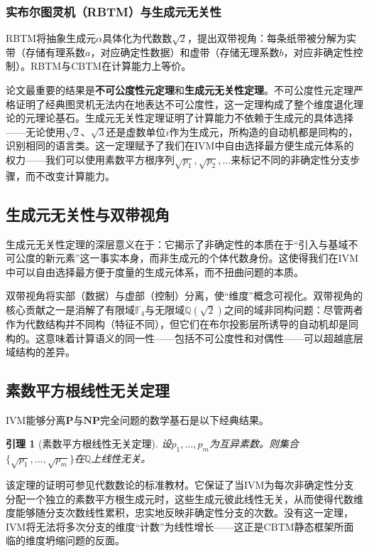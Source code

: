 \documentclass{ctexart}
\newtheorem{lemma}[theorem]{引理}
\begin{document}
	\subsubsection*{实布尔图灵机（RBTM）与生成元无关性}
	
	RBTM将抽象生成元$\alpha$具体化为代数数$\sqrt{2}$，提出双带视角：每条纸带被分解为实带（存储有理系数$a$，对应确定性数据）和虚带（存储无理系数$b$，对应非确定性控制）。RBTM与CBTM在计算能力上等价。
	
	论文\cite{models2026}最重要的结果是\textbf{不可公度性元定理}和\textbf{生成元无关性定理}。不可公度性元定理严格证明了经典图灵机无法内在地表达不可公度性，这一定理构成了整个维度退化理论的元理论基石。生成元无关性定理证明了计算能力不依赖于生成元的具体选择——无论使用$\sqrt{2}$、$\sqrt{3}$还是虚数单位$i$作为生成元，所构造的自动机都是同构的，识别相同的语言类。这一定理赋予了我们在IVM中自由选择最方便生成元体系的权力——我们可以使用素数平方根序列$\sqrt{p_1}, \sqrt{p_2}, \dots$来标记不同的非确定性分支步骤，而不改变计算能力。
	
	\subsection{生成元无关性与双带视角}
	
	生成元无关性定理的深层意义在于：它揭示了非确定性的本质在于``引入与基域不可公度的新元素''这一事实本身，而非生成元的个体代数身份。这使得我们在IVM中可以自由选择最方便于度量的生成元体系，而不扭曲问题的本质。
	
	双带视角将实部（数据）与虚部（控制）分离，使``维度''概念可视化。双带视角的核心贡献之一是消解了有限域$\mathbb{F}_4$与无限域$\mathbb{Q}(\sqrt{2})$之间的域非同构问题：尽管两者作为代数结构并不同构（特征不同），但它们在布尔投影层所诱导的自动机却是同构的。这意味着计算语义的同一性——包括不可公度性和对偶性——可以超越底层域结构的差异。
	
	\subsection{素数平方根线性无关定理}
	
	IVM能够分离$\mathbf{P}$与$\mathbf{NP}$完全问题的数学基石是以下经典结果。
	
	\begin{lemma}[素数平方根线性无关定理]\label{lem:commensurability}
		设$p_1, \dots, p_m$为互异素数。则集合$\{\sqrt{p_1}, \dots, \sqrt{p_m}\}$在$\mathbb{Q}$上线性无关。
	\end{lemma}
	
	该定理的证明可参见代数数论的标准教材\cite{lang2002}。它保证了当IVM为每次非确定性分支分配一个独立的素数平方根生成元时，这些生成元彼此线性无关，从而使得代数维度能够随分支次数线性累积，忠实地反映非确定性分支的次数。没有这一定理，IVM将无法将多次分支的维度``计数''为线性增长——这正是CBTM静态框架所面临的维度坍缩问题的反面。
	
\end{document}

